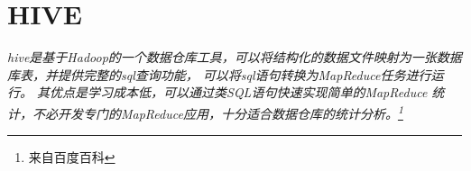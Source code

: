 \documentclass{article}
\begin{document}
\section{HIVE}
\textit{
hive是基于Hadoop的一个数据仓库工具，可以将结构化的数据文件映射为一张数据库表，并提供完整的sql查询功能，
可以将sql语句转换为MapReduce任务进行运行。 其优点是学习成本低，可以通过类SQL语句快速实现简单的MapReduce
统计，不必开发专门的MapReduce应用，十分适合数据仓库的统计分析。\footnote{来自百度百科}
}
\end{document}
